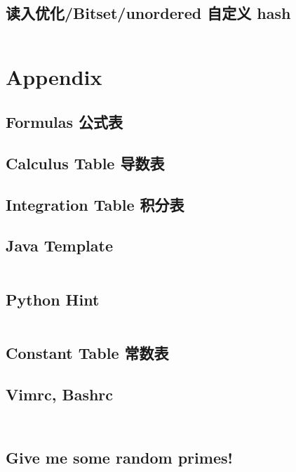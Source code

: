 \documentclass[titlepage, a4paper]{article}
\begin{document}
\begin{multicols}{2}
\begin{spacing}{0.6}
				\subsection{读入优化/Bitset/unordered 自定义 hash}
				\inputminted{cpp}{src/Miscellany/hack.cpp}

			\section{Appendix}
				\begin{spacing}{0.5}
				\subsection{Formulas 公式表}
				
				\subsection{Calculus Table 导数表}
				
				\subsection{Integration Table 积分表}
				
				\subsection{Java Template}
				\inputminted{java}{src/Miscellany/Main.java}
				\subsection{Python Hint}
				\inputminted{python}{src/Miscellany/py.py}
				\subsection{Constant Table 常数表}
				
				\end{spacing}
				\subsection{Vimrc, Bashrc}
				\inputminted{vim}{src/Miscellany/vimrc}
				\inputminted{sh}{src/Miscellany/bashrc}
				\subsection{Give me some random primes!}
				\texttt{}
				\newpage

\end{spacing}
\end{multicols}
\end{document}
